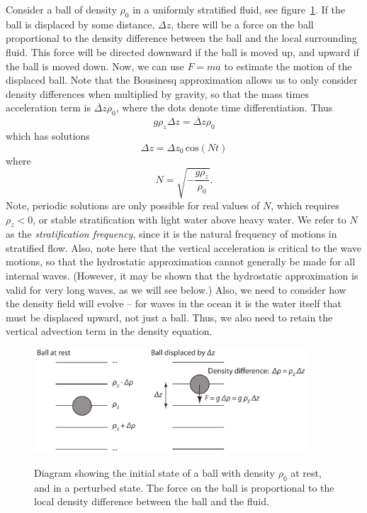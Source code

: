 \documentclass[11pt]{report}
\numberwithin{equation}{section}
\begin{document}
Consider a ball of density $\rho_0$ in a uniformly stratified fluid, see figure~\ref{fig:stratified_ball}.  If the ball is displaced by some distance, $\Delta z$, there will be a force on the ball proportional to the density difference between the ball and the local surrounding fluid.  This force will be directed downward if the ball is moved up, and upward if the ball is moved down.  Now, we can use $F=m a$ to estimate the motion of the displaced ball.  Note that the Bousinesq approximation allows us to only consider density differences when multiplied by gravity, so that the mass times acceleration term is $\ddot{\Delta z} \rho_0$, where the dots denote time differentiation.  Thus
\begin{equation}
    g \rho_z \Delta{}z = \ddot{\Delta z} \rho_0
\end{equation}
which has solutions
\begin{equation}
    \Delta{}z = \Delta{}z_0 \,\mathrm{cos}(N t)
\end{equation}
where
\begin{equation}
    N =  \sqrt{ - \frac{g \rho_z}{\rho_0}}.
\end{equation}
Note, periodic solutions are only possible for real values of $N$, which requires $\rho_z<0$, or stable stratification with light water above heavy water.  We refer to $N$ as the \emph{stratification frequency}, since it is the natural frequency of motions in stratified flow.  Also, note here that the vertical acceleration is critical to the wave motions, so that the hydrostatic approximation cannot generally be made for all internal waves.  (However, it may be shown that the hydrostatic approximation is valid for very long waves, as we will see below.) Also, we need to consider how the density field will evolve -- for waves in the ocean it is the water itself that must be displaced upward, not just a ball.  Thus, we also need to retain the vertical advection term in the density equation. 

\begin{figure}
    \centering
    \includegraphics[width=4in]{stratified_ball}
    \label{fig:stratified_ball}
    \caption{Diagram showing the initial state of a ball with density $\rho_0$ at rest, and in a perturbed state.  The force on the ball is proportional to the local density difference between the ball and the fluid.}
\end{figure}
\end{document}
